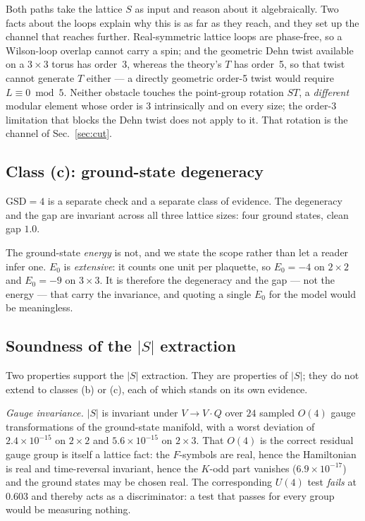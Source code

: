\documentclass[aps,pra,twocolumn,superscriptaddress,longbibliography,floatfix,nofootinbib]{revtex4-2}
\begin{document}
Both paths take the lattice $S$ as input and reason about it algebraically. Two
facts about the loops explain why this is as far as they reach, and they set up
the channel that reaches further. Real-symmetric lattice loops are phase-free,
so a Wilson-loop overlap cannot carry a spin; and the geometric Dehn twist
available on a $3\times3$ torus has order~3, whereas the theory's $T$ has
order~5, so that twist cannot generate $T$ either --- a directly geometric
order-5 twist would require $L\equiv0\bmod5$. Neither obstacle touches the
point-group rotation $ST$, a \emph{different} modular element whose order is $3$
intrinsically and on every size; the order-3 limitation that blocks the Dehn
twist does not apply to it. That rotation is the channel of Sec.~\ref{sec:cut}.

\subsection{Class (c): ground-state degeneracy}
\label{sec:classc}

$\mathrm{GSD}=4$ is a separate check and a separate class of evidence. The
degeneracy and the gap are invariant across all three lattice sizes: four
ground states, clean gap $1.0$.

The ground-state \emph{energy} is not, and we state the scope rather than let a
reader infer one. $E_0$ is \emph{extensive}: it counts one unit per plaquette,
so $E_0=-4$ on $2\times2$ and $E_0=-9$ on $3\times3$. It is therefore the
degeneracy and the gap --- not the energy --- that carry the invariance, and
quoting a single $E_0$ for the model would be meaningless.

\subsection{Soundness of the $|S|$ extraction}
\label{sec:soundness}

Two properties support the $|S|$ extraction. They are properties of $|S|$; they
do not extend to classes (b) or (c), each of which stands on its own evidence.

\emph{Gauge invariance.} $|S|$ is invariant under $V\to V\cdot Q$ over $24$
sampled $O(4)$ gauge transformations of the ground-state manifold, with a worst
deviation of $2.4\times10^{-15}$ on $2\times2$ and $5.6\times10^{-15}$ on
$2\times3$. That $O(4)$ is the correct residual gauge group is itself a
lattice fact: the $F$-symbols are real, hence the Hamiltonian is real and
time-reversal invariant, hence the $K$-odd part vanishes ($6.9\times10^{-17}$)
and the ground states may be chosen real. The corresponding $U(4)$ test
\emph{fails} at $0.603$ and thereby acts as a discriminator: a test that passes
for every group would be measuring nothing.
\end{document}
